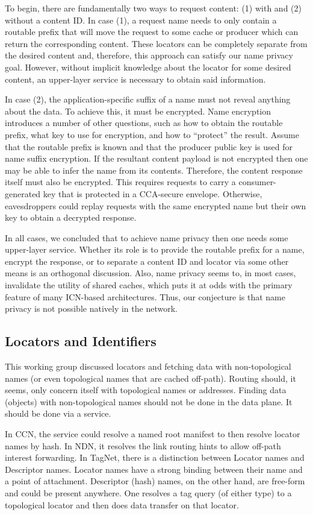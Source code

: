 To begin, there are fundamentally two ways to request content: (1) with and (2) without a content ID. In case (1), a request name needs to only contain a routable prefix that will move the request to some cache or producer which can return the corresponding content. These locators can be completely separate from the desired content and, therefore, this approach can satisfy our name privacy goal. However, without implicit knowledge about the locator for some desired content, an upper-layer service is necessary to obtain said information.

In case (2), the application-specific suffix of a name must not reveal anything about the data. To achieve this, it must be encrypted. Name encryption introduces a number of other questions, such as how to obtain the routable prefix, what key to use for encryption, and how to ``protect'' the result. Assume that the routable prefix is known and that the producer public key is used for name suffix encryption. If the resultant content payload is not encrypted then one may be able to infer the name from its contents. Therefore, the content response itself must also be encrypted. This requires requests to carry a consumer-generated key that is protected in a CCA-secure envelope. Otherwise, eavesdroppers could replay requests with the same encrypted name but their own key to obtain a decrypted response.

In all cases, we concluded that to achieve name privacy then one needs some upper-layer service. Whether its role is to provide the routable prefix for a name, encrypt the response, or to separate a content ID and locator via some other means is an orthogonal discussion. Also, name privacy seems to, in most cases, invalidate the utility of shared caches, which puts it at odds with the primary feature of many ICN-based architectures. Thus, our conjecture is that name privacy is not possible natively in the network.


\subsection{Locators and Identifiers}
This working group discussed locators and fetching data with non-topological names (or even topological names that are cached off-path). Routing should, it seems, only concern itself with topological names or addresses.  Finding data (objects) with non-topological names should not be done in the data plane.  It should be done via a service.

In CCN, the service could resolve a named root manifest to then resolve locator names by hash.
In NDN, it resolves the link routing hints to allow off-path interest forwarding. In TagNet,
there is a distinction between Locator names and Descriptor names. Locator names have a
strong binding between their name and a point of attachment. Descriptor (hash) names, on the
other hand, are free-form and could be present anywhere.  One resolves a tag query (of either
type) to a topological locator and then does data transfer on that locator.

